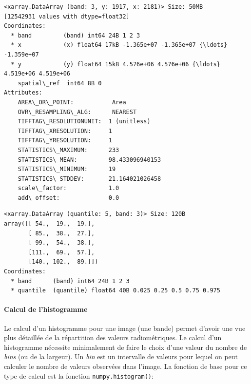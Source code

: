 \documentclass[11pt]{article}
\makeatletter
\newcommand{\boxspacing}{\kern\kvtcb@left@rule\kern\kvtcb@boxsep}
\newcommand{\prompt}[4]{
        {\ttfamily\llap{{\color{#2}[#3]:\hspace{3pt}#4}}\vspace{-\baselineskip}}
    }
\makeatother
\begin{document}
    \begin{Verbatim}[commandchars=\\\{\}]
<xarray.DataArray (band: 3, y: 1917, x: 2181)> Size: 50MB
[12542931 values with dtype=float32]
Coordinates:
  * band         (band) int64 24B 1 2 3
  * x            (x) float64 17kB -1.365e+07 -1.365e+07 {\ldots} -1.359e+07
  * y            (y) float64 15kB 4.576e+06 4.576e+06 {\ldots} 4.519e+06 4.519e+06
    spatial\_ref  int64 8B 0
Attributes:
    AREA\_OR\_POINT:           Area
    OVR\_RESAMPLING\_ALG:      NEAREST
    TIFFTAG\_RESOLUTIONUNIT:  1 (unitless)
    TIFFTAG\_XRESOLUTION:     1
    TIFFTAG\_YRESOLUTION:     1
    STATISTICS\_MAXIMUM:      233
    STATISTICS\_MEAN:         98.433096940153
    STATISTICS\_MINIMUM:      19
    STATISTICS\_STDDEV:       21.164021026458
    scale\_factor:            1.0
    add\_offset:              0.0
    \end{Verbatim}

            \begin{tcolorbox}[breakable, size=fbox, boxrule=.5pt, pad at break*=1mm, opacityfill=0]
\prompt{Out}{outcolor}{7}{\boxspacing}
\begin{Verbatim}[commandchars=\\\{\}]
<xarray.DataArray (quantile: 5, band: 3)> Size: 120B
array([[ 54.,  19.,  19.],
       [ 85.,  38.,  27.],
       [ 99.,  54.,  38.],
       [111.,  69.,  57.],
       [140., 102.,  89.]])
Coordinates:
  * band      (band) int64 24B 1 2 3
  * quantile  (quantile) float64 40B 0.025 0.25 0.5 0.75 0.975
\end{Verbatim}
\end{tcolorbox}
        
    \hypertarget{calcul-de-lhistogramme}{%
\paragraph{Calcul de l'histogramme}\label{calcul-de-lhistogramme}}

Le calcul d'un histogramme pour une image (une bande) permet d'avoir une
vue plus détaillée de la répartition des valeurs radiométriques. Le
calcul d'un histogramme nécessite minimalement de faire le choix d'une
valeur du nombre de \emph{bins} (ou de la largeur). Un \emph{bin} est un
intervalle de valeurs pour lequel on peut calculer le nombre de valeurs
observées dans l'image. La fonction de base pour ce type de calcul est
la fonction \texttt{numpy.histogram()}:
\end{document}
